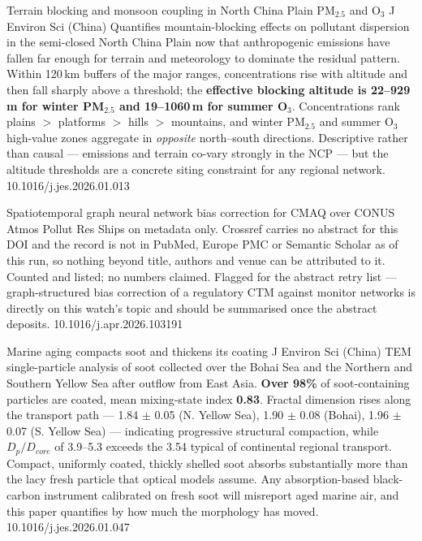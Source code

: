 \documentclass[10pt]{article}
\begin{document}
{Terrain blocking and monsoon coupling in North China Plain PM$_{2.5}$ and O$_3$}
{J Environ Sci (China)}
{Quantifies mountain-blocking effects on pollutant dispersion in the semi-closed North
China Plain now that anthropogenic emissions have fallen far enough for terrain and
meteorology to dominate the residual pattern. Within 120\,km buffers of the major ranges,
concentrations rise with altitude and then fall sharply above a threshold; the
\textbf{effective blocking altitude is 22--929\,m for winter PM$_{2.5}$ and 19--1060\,m
for summer O$_3$}. Concentrations rank plains $>$ platforms $>$ hills $>$ mountains, and
winter PM$_{2.5}$ and summer O$_3$ high-value zones aggregate in \emph{opposite}
north--south directions. Descriptive rather than causal --- emissions and terrain
co-vary strongly in the NCP --- but the altitude thresholds are a concrete siting
constraint for any regional network.}
{10.1016/j.jes.2026.01.013}

{Spatiotemporal graph neural network bias correction for CMAQ over CONUS}
{Atmos Pollut Res}
{Ships on metadata only. Crossref carries no abstract for this DOI and the record is not
in PubMed, Europe PMC or Semantic Scholar as of this run, so nothing beyond title,
authors and venue can be attributed to it. Counted and listed; no numbers claimed.
Flagged for the abstract retry list --- graph-structured bias correction of a regulatory
CTM against monitor networks is directly on this watch's topic and should be summarised
once the abstract deposits.}
{10.1016/j.apr.2026.103191}

{Marine aging compacts soot and thickens its coating}
{J Environ Sci (China)}
{TEM single-particle analysis of soot collected over the Bohai Sea and the Northern and
Southern Yellow Sea after outflow from East Asia. \textbf{Over 98\%} of soot-containing
particles are coated, mean mixing-state index \textbf{0.83}. Fractal dimension rises along
the transport path --- 1.84 $\pm$ 0.05 (N. Yellow Sea), 1.90 $\pm$ 0.08 (Bohai), 1.96
$\pm$ 0.07 (S. Yellow Sea) --- indicating progressive structural compaction, while
$D_p/D_{core}$ of 3.9--5.3 exceeds the 3.54 typical of continental regional transport.
Compact, uniformly coated, thickly shelled soot absorbs substantially more than the
lacy fresh particle that optical models assume. Any absorption-based black-carbon
instrument calibrated on fresh soot will misreport aged marine air, and this paper
quantifies by how much the morphology has moved.}
{10.1016/j.jes.2026.01.047}
\end{document}
